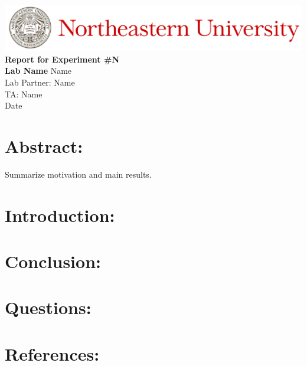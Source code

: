 \documentclass[12pt,a4paper]{article}
\begin{document}
\begin{center}
	\includegraphics[width=\textwidth]{./Images/Header.jpeg}
	\vfill		
	\textbf{\Large{Report for Experiment \#N\\
	Lab Name}}
	\vfill
	Name\\
	Lab Partner: Name\\
	TA: Name\\
	Date
	\vfill
\end{center}
	
\section*{Abstract:}
	Summarize motivation and main results.
	
\newpage
	
\section*{Introduction:}
\section*{Conclusion:}
\section*{Questions:}
\section*{References:}
\end{document}
